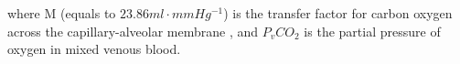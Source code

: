 \noindent where M (equals to $23.86 ml \cdot mmHg^{-1}$) is the transfer factor for carbon oxygen across the capillary-alveolar membrane \citep{chakraborty2004diffusing}, and $P_vCO_2$ is the partial pressure of oxygen in mixed venous blood.

%
%
%
%
%
%
%
%
